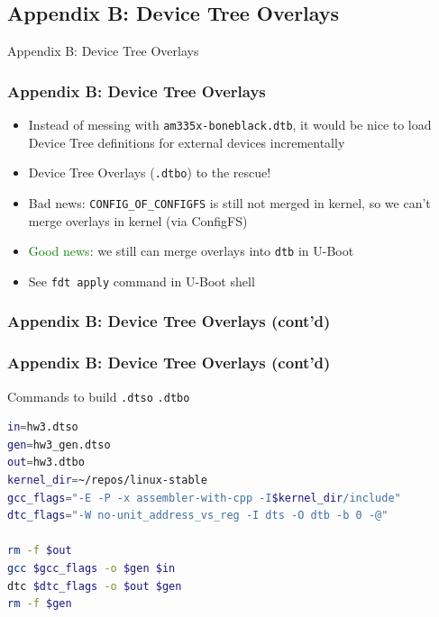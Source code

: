 \subsection{Appendix B: Device Tree Overlays}

\begin{frame}[standout]
  Appendix B: Device Tree Overlays
\end{frame}

\begin{frame}
  \frametitle{Appendix B: Device Tree Overlays}
  \begin{itemize}
    \item Instead of messing with \texttt{am335x-boneblack.dtb}, it would be
          nice to load Device Tree definitions for external devices
          incrementally
    \item Device Tree Overlays (\texttt{.dtbo}) to the rescue!
    \item \alert{Bad news}: \texttt{CONFIG\_OF\_CONFIGFS} is still not merged
          in kernel, so we can't merge overlays in kernel (via ConfigFS)
    \item \textcolor{green}{Good news}: we still can merge overlays into
          \texttt{dtb} in U-Boot
    \item See \texttt{fdt apply} command in U-Boot shell
  \end{itemize}
\end{frame}

\begin{frame}[containsverbatim,allowframebreaks=1]
  \frametitle{Appendix B: Device Tree Overlays (cont'd)}
  
\end{frame}

\begin{frame}[containsverbatim]
  \frametitle{Appendix B: Device Tree Overlays (cont'd)}
  Commands to build \texttt{.dtso} \textrightarrow \texttt{.dtbo}
  \begin{lstlisting}[language=bash,numbers=none]
in=hw3.dtso
gen=hw3_gen.dtso
out=hw3.dtbo
kernel_dir=~/repos/linux-stable
gcc_flags="-E -P -x assembler-with-cpp -I$kernel_dir/include"
dtc_flags="-W no-unit_address_vs_reg -I dts -O dtb -b 0 -@"

rm -f $out
gcc $gcc_flags -o $gen $in
dtc $dtc_flags -o $out $gen
rm -f $gen
  \end{lstlisting}
\end{frame}


